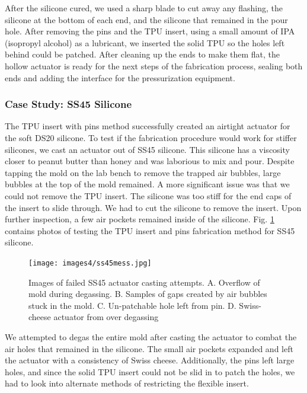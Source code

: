 After the silicone cured, we used a sharp blade to cut away any flashing, the silicone at the bottom of each end, and the silicone that remained in the pour hole. After removing the pins and the TPU insert, using a small amount of IPA (isopropyl alcohol) as a lubricant, we inserted the solid TPU so the holes left behind could be patched. After cleaning up the ends to make them flat, the hollow actuator is ready for the next steps of the fabrication process, sealing both ends and adding the interface for the pressurization equipment. 

\clearpage
\subsubsection{Case Study: SS45 Silicone}
The TPU insert with pins method successfully created an airtight actuator for the soft DS20 silicone. To test if the fabrication procedure would work for stiffer silicones, we cast an actuator out of SS45 silicone. This silicone has a viscosity closer to peanut butter than honey and was laborious to mix and pour. Despite tapping the mold on the lab bench to remove the trapped air bubbles, large bubbles at the top of the mold remained. A more significant issue was that we could not remove the TPU insert. The silicone was too stiff for the end caps of the insert to slide through. We had to cut the silicone to remove the insert. Upon further inspection, a few air pockets remained inside of the silicone. Fig. \ref{fig:ss45mess} contains photos of testing the TPU insert and pins fabrication method for SS45 silicone. 

\begin{figure}[ht]
    \centering
    \texttt{[image: images4/ss45mess.jpg]}
    \caption{Images of failed SS45 actuator casting attempts. A. Overflow of mold during degassing. B. Samples of gaps created by air bubbles stuck in the mold. C. Un-patchable hole left from pin. D. Swiss-cheese actuator from over degassing}
    \label{fig:ss45mess}
\end{figure}

We attempted to degas the entire mold after casting the actuator to combat the air holes that remained in the silicone. The small air pockets expanded and left the actuator with a consistency of Swiss cheese. Additionally, the pins left large holes, and since the solid TPU insert could not be slid in to patch the holes, we had to look into alternate methods of restricting the flexible insert. 

\clearpage
